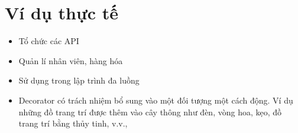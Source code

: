 \section{Ví dụ thực tế}
\begin{itemize}
    \item Tổ chức các API
    \item Quản lí nhân viên, hàng hóa
    \item Sử dụng trong lập trình đa luồng
    \item Decorator có trách nhiệm bổ sung vào một đối tượng một cách động. Ví dụ những đồ trang trí được thêm vào cây thông như đèn, vòng hoa, kẹo, đồ trang trí bằng thủy tinh, v.v.,
\end{itemize}